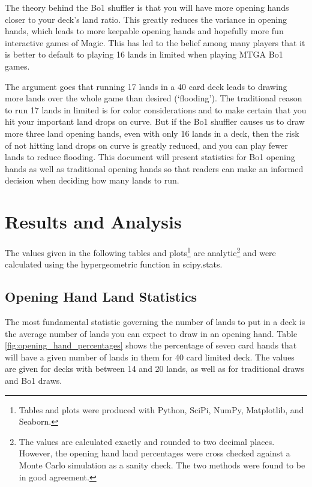 \documentclass[oneside]{book}   %
\begin{document}
The theory behind the Bo1 shuffler is that you will have more opening hands closer to your deck's land ratio. This greatly reduces the variance in opening hands, which leads to more keepable opening hands and hopefully more fun interactive games of Magic. This has led to the belief among many players that it is better to default to playing 16 lands in limited when playing MTGA Bo1 games. 

The argument goes that running 17 lands in a 40 card deck leads to drawing more lands over the whole game than desired (`flooding'). The traditional reason to run 17 lands in limited is for color considerations and to make certain that you hit your important land drops on curve. But if the Bo1 shuffler causes us to draw more three land opening hands, even with only 16 lands in a deck, then the risk of not hitting land drops on curve is greatly reduced, and you can play fewer lands to reduce flooding. This document will present statistics for Bo1 opening hands as well as traditional opening hands so that readers can make an informed decision when deciding how many lands to run.

\chapter{Results and Analysis}
\label{results}

The values given in the following tables and plots\footnote{Tables and plots were produced with Python, SciPi, NumPy, Matplotlib, and Seaborn.} are analytic\footnote{The values are calculated exactly and rounded to two decimal places. However, the opening hand land percentages were cross checked against a Monte Carlo simulation as a sanity check. The two methods were found to be in good agreement.} and were calculated using the hypergeometric function in scipy.stats.  %

\section{Opening Hand Land Statistics}
\label{opener}

The most fundamental statistic governing the number of lands to put in a deck is the average number of lands you can expect to draw in an opening hand. Table \ref{fig:opening_hand_percentages} shows the percentage of seven card hands that will have a given number of lands in them for 40 card limited deck. The values are given for decks with between 14 and 20 lands, as well as for traditional draws and Bo1 draws.  
\end{document}
